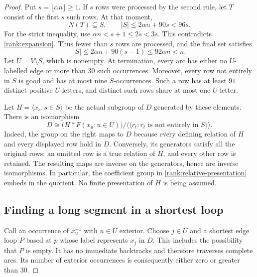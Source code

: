 \begin{proof}
Put $s=\lfloor\alpha n\rfloor\ge1$.  If $s$ rows were processed by
the second rule, let $T$ consist of the first $s$ such rows.  At that
moment,
\[
 N(T)\subseteq S,
 \qquad |S|\le2\alpha n+90s<96s.
\]
For the strict inequality, use
$\alpha n<s+1\le2s<3s$.  This contradicts
\eqref{rank:expansion}.  Thus fewer than $s$ rows are processed, and the
final set satisfies
\begin{equation}\label{rank:saturation}
 |S|\le2\alpha n+90(s-1)\le92\alpha n<n.
\end{equation}
Let $U=V\setminus S$, which is nonempty.  At termination, every arc
has either no $U$-labelled edge or more than $30$ such occurrences.
Moreover, every row not entirely in $S$ is good and has at most nine
$S$-occurrences.  Such a row has at least $91$ distinct positive
$U$-letters, and distinct such rows share at most one $U$-letter.

Let $H=\langle x_s:s\in S\rangle$ be the actual subgroup of $D$
generated by these elements.  There is an isomorphism
\begin{equation}\label{rank:relative-presentation}
 D\cong
 \bigl(H*F(x_u:u\in U)\bigr)
 \big/\langle\!\langle r_t:\text{$r_t$ is not entirely in $S$}
 \rangle\!\rangle.
\end{equation}
Indeed, the group on the right maps to $D$ because every defining
relation of $H$ and every displayed row hold in $D$.  Conversely, its
generators satisfy all the original rows: an omitted row is a true
relation of $H$, and every other row is retained.  The resulting maps
are inverse on the generators, hence are inverse isomorphisms.
In particular, the coefficient group in
\eqref{rank:relative-presentation} embeds in the quotient.  No finite
presentation of $H$ is being assumed.

\subsection*{Finding a long segment in a shortest loop}
Call an occurrence of $x_u^{\pm1}$ with $u\in U$ exterior.
Choose $j\in U$ and a shortest edge loop $P$ based at $p$ whose label
represents $x_j$ in $D$.  This includes the possibility that $P$ is
empty.  It has no immediate backtracks and therefore traverses complete
arcs.  Its number of exterior occurrences is consequently either zero
or greater than $30$.


\end{proof}
